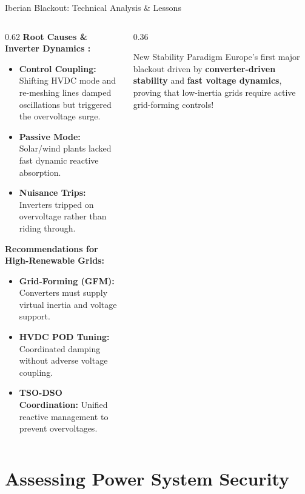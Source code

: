 \begin{frame}{Iberian Blackout: Technical Analysis \& Lessons}
\begin{columns}[T]
\begin{column}{0.62\textwidth}
    \scriptsize
    \textbf{Root Causes \& Inverter Dynamics \cite{entsoe2026iberia}:}
    \begin{itemize}\setlength{\itemsep}{1pt}
        \item \textbf{Control Coupling:} Shifting HVDC mode and re-meshing lines damped oscillations but triggered the overvoltage surge.
        \item \textbf{Passive Mode:} Solar/wind plants lacked fast dynamic reactive absorption.
        \item \textbf{Nuisance Trips:} Inverters tripped on overvoltage rather than riding through.
    \end{itemize}
    \vspace{2pt}
    \textbf{Recommendations for High-Renewable Grids:}
    \begin{itemize}\setlength{\itemsep}{1pt}
        \item \textbf{Grid-Forming (GFM):} Converters must supply virtual inertia and voltage support.
        \item \textbf{HVDC POD Tuning:} Coordinated damping without adverse voltage coupling.
        \item \textbf{TSO-DSO Coordination:} Unified reactive management to prevent overvoltages.
    \end{itemize}
\end{column}
\begin{column}{0.36\textwidth}
    \begin{alertblock}{New Stability Paradigm}
    \scriptsize
    Europe's first major blackout driven by \textbf{converter-driven stability} and \textbf{fast voltage dynamics}, proving that low-inertia grids require active grid-forming controls!
    \end{alertblock}
\end{column}
\end{columns}
\end{frame}

\section{Assessing Power System Security}

